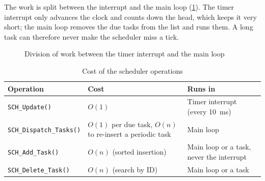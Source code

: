 \documentclass[twoside,final]{hcmut-report}
\begin{document}
The work is split between the interrupt and the main loop (\cref{fig:architecture}). The timer interrupt only advances the clock and counts down the head, which keeps it very short; the main loop removes the due tasks from the list and runs them. A long task can therefore never make the scheduler miss a tick.

\begin{figure}[H]
    \centering
    \caption{Division of work between the timer interrupt and the main loop}
    \label{fig:architecture}
\end{figure}

\begin{table}[H]
    \centering
    \caption{Cost of the scheduler operations}
    \label{tab:complexity}
    \begin{tabular}{L{0.28\textwidth}L{0.3\textwidth}L{0.3\textwidth}}
        \toprule
        \textbf{Operation} & \textbf{Cost} & \textbf{Runs in} \\
        \midrule
        \texttt{SCH\_Update()} & $O(1)$ & Timer interrupt (every 10~ms) \\
        \texttt{SCH\_Dispatch\_Tasks()} & $O(1)$ per due task, $O(n)$ to re-insert a periodic task & Main loop \\
        \texttt{SCH\_Add\_Task()} & $O(n)$ (sorted insertion) & Main loop or a task, never the interrupt \\
        \texttt{SCH\_Delete\_Task()} & $O(n)$ (search by ID) & Main loop or a task \\
        \bottomrule
    \end{tabular}
\end{table}
\end{document}
